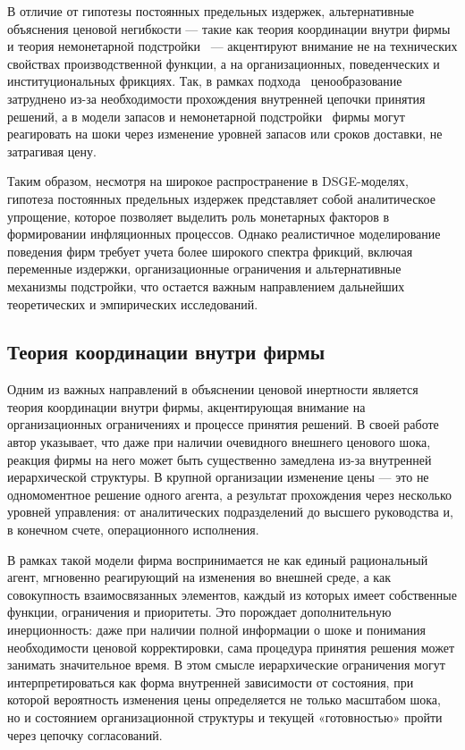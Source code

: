 В отличие от гипотезы постоянных предельных издержек, альтернативные объяснения ценовой негибкости — такие как теория координации внутри фирмы~\cite{Blinder1991} и теория немонетарной подстройки~\cite{Blinder1981, Carlton1989} — акцентируют внимание не на технических свойствах производственной функции, а на организационных, поведенческих и институциональных фрикциях. Так, в рамках подхода~\cite{Blinder1991} ценообразование затруднено из-за необходимости прохождения внутренней цепочки принятия решений, а в модели запасов и немонетарной подстройки~\cite{Carlton1989} фирмы могут реагировать на шоки через изменение уровней запасов или сроков доставки, не затрагивая цену.

Таким образом, несмотря на широкое распространение в DSGE-моделях, гипотеза постоянных предельных издержек представляет собой аналитическое упрощение, которое позволяет выделить роль монетарных факторов в формировании инфляционных процессов. Однако реалистичное моделирование поведения фирм требует учета более широкого спектра фрикций, включая переменные издержки, организационные ограничения и альтернативные механизмы подстройки, что остается важным направлением дальнейших теоретических и эмпирических исследований.

\subsection{Теория координации внутри фирмы}\label{subsec:ch1/sec2/firmcoordination}

Одним из важных направлений в объяснении ценовой инертности является теория координации внутри фирмы, акцентирующая внимание на организационных ограничениях и процессе принятия решений. В своей работе \cite{Blinder1991} автор указывает, что даже при наличии очевидного внешнего ценового шока, реакция фирмы на него может быть существенно замедлена из-за внутренней иерархической структуры. В крупной организации изменение цены — это не одномоментное решение одного агента, а результат прохождения через несколько уровней управления: от аналитических подразделений до высшего руководства и, в конечном счете, операционного исполнения.

В рамках такой модели фирма воспринимается не как единый рациональный агент, мгновенно реагирующий на изменения во внешней среде, а как совокупность взаимосвязанных элементов, каждый из которых имеет собственные функции, ограничения и приоритеты. Это порождает дополнительную инерционность: даже при наличии полной информации о шоке и понимания необходимости ценовой корректировки, сама процедура принятия решения может занимать значительное время. В этом смысле иерархические ограничения могут интерпретироваться как форма внутренней зависимости от состояния, при которой вероятность изменения цены определяется не только масштабом шока, но и состоянием организационной структуры и текущей «готовностью» пройти через цепочку согласований.

